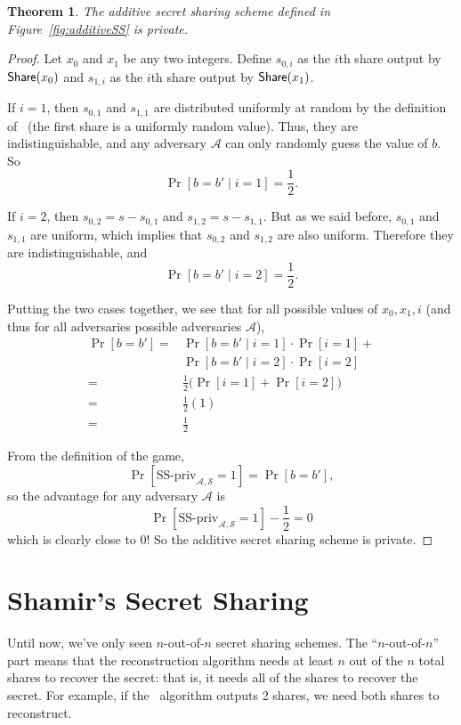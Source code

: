 \documentclass[12 pt]{article}
\newtheorem{theorem}{Theorem}
\def\A{\ensuremath{\mathcal{A}}}
\def\ss{\ensuremath{\mathcal{S}}}
\newcounter{example}[section]
\begin{document}
\begin{theorem}
    The additive secret sharing scheme defined in Figure~\ref{fig:additiveSS}
    is private.
\end{theorem}
\begin{proof}
    Let $x_0$ and $x_1$ be any two integers. Define $s_{0,i}$ as
    the $i$th share output by $\mathsf{Share}(x_0)$ and $s_{1,i}$ as the 
    $i$th share output by $\mathsf{Share}(x_1)$.

    If $i=1$, then $s_{0,1}$ and $s_{1,1}$ are distributed uniformly 
    at random by the definition of \share~(the first share is 
    a uniformly random value). Thus, they are indistinguishable,
    and any adversary $\A$ can only randomly guess the value of $b$.
    So
    \[
        \Pr[b=b' \mid i=1] = \frac{1}{2}.
    \]

    If $i=2$, then $s_{0,2} = s-s_{0,1}$ and $s_{1,2} = s-s_{1,1}$.
    But as we said before, $s_{0,1}$ and $s_{1,1}$ are uniform,
    which implies that $s_{0,2}$ and $s_{1,2}$ are also uniform.
    Therefore they are indistinguishable, and 
    \[
        \Pr[b=b' \mid i=2] = \frac{1}{2}.
    \]

    Putting the two cases together, we see that for all possible 
    values of $x_0, x_1, i$ (and thus for all adversaries possible
    adversaries $\A$),
    \begin{align*}
        \Pr[b=b']
        =& \Pr[b=b' \mid i=1]\cdot\Pr[i=1] + \\
        & \Pr[b=b' \mid i=2]\cdot\Pr[i=2]\\
        =& \frac{1}{2} \big(\Pr[i=1]+\Pr[i=2]\big)\\
        =& \frac{1}{2}(1)\\
        =& \frac{1}{2}
    \end{align*}

    From the definition of the game, 
    \[
        \Pr[\text{SS-priv}_{\A,\ss}=1] = \Pr[b=b'],
    \]
    so the advantage for any adversary $\A$ is
    \[
        \Pr[\text{SS-priv}_{\A,\ss}=1] - \frac{1}{2} = 0
    \]
    which is clearly close to 0! So the additive secret sharing 
    scheme is private.
\end{proof}

\newpage
\section{Shamir's Secret Sharing}

Until now, we've only seen $n$-out-of-$n$ secret sharing schemes. The ``$n$-out-of-$n$'' part means that 
the reconstruction algorithm needs at least $n$ out of the $n$ total shares to recover the
secret: that is, it needs all of the shares to recover the secret. For example, if the 
\share~algorithm outputs 2 shares, we need both shares to reconstruct.
\end{document}
